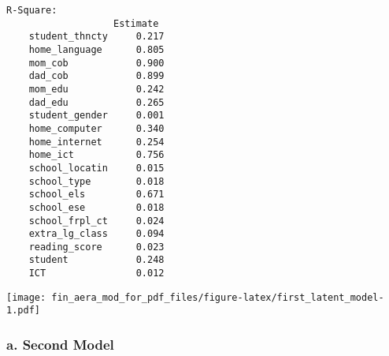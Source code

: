 \documentclass[
]{article}
\begin{document}
\begin{verbatim}
R-Square:
                   Estimate 
    student_thncty     0.217
    home_language      0.805
    mom_cob            0.900
    dad_cob            0.899
    mom_edu            0.242
    dad_edu            0.265
    student_gender     0.001
    home_computer      0.340
    home_internet      0.254
    home_ict           0.756
    school_locatin     0.015
    school_type        0.018
    school_els         0.671
    school_ese         0.018
    school_frpl_ct     0.024
    extra_lg_class     0.094
    reading_score      0.023
    student            0.248
    ICT                0.012
\end{verbatim}

\texttt{[image: fin\_aera\_mod\_for\_pdf\_files/figure-latex/first\_latent\_model-1.pdf]}

\hypertarget{a.-second-model}{%
\subsubsection{a. Second Model}\label{a.-second-model}}
\end{document}
